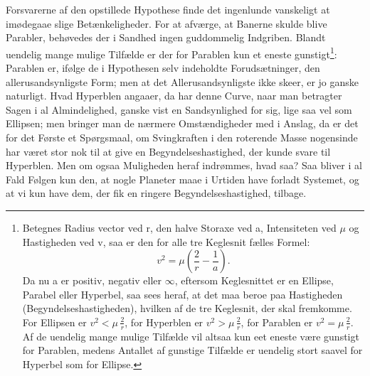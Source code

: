 \documentclass[12pt,a4paper]{book}
\begin{document}
Forsvarerne af den opstillede Hypothese finde det ingenlunde vanskeligt
at imødegaae slige Betænkeligheder. For at afværge, at Banerne skulde
blive Parabler, behøvedes
der i Sandhed ingen guddommelig Indgriben. Blandt uendelig mange mulige
Tilfælde er der for Parablen kun et eneste
gunstigt\footnote{%
Betegnes Radius vector ved r, den halve Storaxe ved a, Intensiteten ved
$\mu$ og Hastigheden ved v, saa er den for alle tre Keglesnit fælles
Formel:
\[ v^2 = \mu\left(\frac{2}{r} - \frac{1}{a}\right). \]
Da nu a er positiv, negativ eller $\infty$, eftersom Keglesnittet er en
Ellipse, Parabel eller Hyperbel, saa sees heraf, at det maa beroe paa
Hastigheden (Begyndelseshastigheden), hvilken af de tre Keglesnit, der
skal fremkomme. For Ellipsen er $v^2 < \mu\,\frac{2}{r}$, for Hyperblen
er $v^2 > \mu\,\frac{2}{r}$, for Parablen er $v^2 = \mu\,\frac{2}{r}$.
Af de uendelig mange mulige Tilfælde vil altsaa kun eet eneste være
gunstigt for Parablen, medens Antallet af gunstige Tilfælde er uendelig
stort saavel for Hyperbel som for Ellipse.}:
Parablen er, ifølge de i Hypothesen selv indeholdte Forudsætninger, den
allerusandsynligste Form; men at det Allerusandsynligste ikke skeer, er
jo ganske naturligt. Hvad Hyperblen angaaer, da har denne Curve, naar
man betragter Sagen i al Almindelighed, ganske vist en Sandsynlighed for
sig, lige saa vel som Ellipsen; men bringer man de nærmere
Omstændigheder med i Anslag, da er det for det Første et Spørgsmaal, om
Svingkraften i den roterende Masse nogensinde har været stor nok til at
give en Begyndelseshastighed, der kunde svare til Hyperblen. Men om
ogsaa Muligheden heraf indrømmes, hvad saa? Saa bliver i al Fald Følgen
kun den, at nogle Planeter maae i Urtiden have forladt Systemet, og at
vi kun have dem, der fik en ringere Begyndelseshastighed, tilbage.
\end{document}
